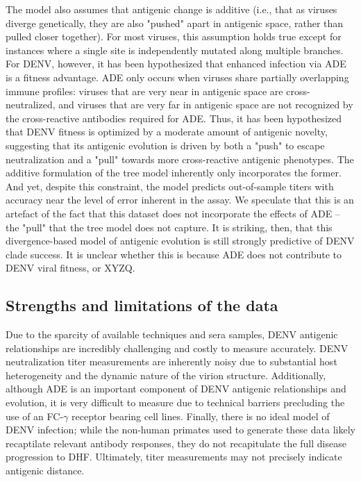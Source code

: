 \documentclass[11pt,oneside,letterpaper]{article}
\begin{document}
The model also assumes that antigenic change is additive (i.e., that as viruses diverge genetically, they are also "pushed" apart in antigenic space, rather than pulled closer together).
For most viruses, this assumption holds true except for instances where a single site is independently mutated along multiple branches.
For DENV, however, it has been hypothesized that enhanced infection via ADE is a fitness advantage.
ADE only occurs when viruses share partially overlapping immune profiles: viruses that are very near in antigenic space are cross-neutralized, and viruses that are very far in antigenic space are not recognized by the cross-reactive antibodies required for ADE.
Thus, it has been hypothesized that DENV fitness is optimized by a moderate amount of antigenic novelty, suggesting that its antigenic evolution is driven by both a "push" to escape neutralization and a "pull" towards more cross-reactive antigenic phenotypes.
The additive formulation of the tree model inherently only incorporates the former.
And yet, despite this constraint, the model predicts out-of-sample titers with accuracy near the level of error inherent in the assay.
We speculate that this is an artefact of the fact that this dataset does not incorporate the effects of ADE -- the "pull" that the tree model does not capture.
It is striking, then, that this divergence-based model of antigenic evolution is still strongly predictive of DENV clade success.
It is unclear whether this is because ADE does not contribute to DENV viral fitness, or XYZQ.

\subsection*{Strengths and limitations of the data}
Due to the sparcity of available techniques and sera samples, DENV antigenic relationships are incredibly challenging and costly to measure accurately.
DENV neutralization titer measurements are inherently noisy due to substantial host heterogeneity and the dynamic nature of the virion structure.
Additionally, although ADE is an important component of DENV antigenic relationships and evolution, it is very difficult to measure due to technical barriers precluding the use of an FC-$\gamma$ receptor bearing cell lines.
Finally, there is no ideal model of DENV infection; while the non-human primates used to generate these data likely recaptilate relevant antibody responses, they do not recapitulate the full disease progression to DHF.
Ultimately, titer measurements may not precisely indicate antigenic distance.
\end{document}
